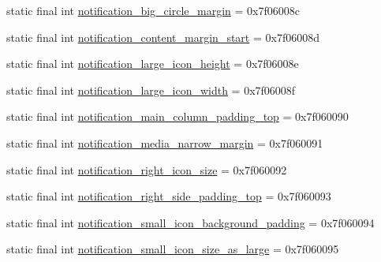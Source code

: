 \begin{DoxyCompactItemize}
\item 
static final int \mbox{\hyperlink{classandroid_1_1support_1_1graphics_1_1drawable_1_1animated_1_1R_1_1dimen_a29843189f8be69df69dab88fc2bd0316}{notification\+\_\+big\+\_\+circle\+\_\+margin}} = 0x7f06008c
\item 
static final int \mbox{\hyperlink{classandroid_1_1support_1_1graphics_1_1drawable_1_1animated_1_1R_1_1dimen_ab77e9e0b68ae1bdcca7c792a180808f6}{notification\+\_\+content\+\_\+margin\+\_\+start}} = 0x7f06008d
\item 
static final int \mbox{\hyperlink{classandroid_1_1support_1_1graphics_1_1drawable_1_1animated_1_1R_1_1dimen_a425b66d703859f43139060e3ee7e742f}{notification\+\_\+large\+\_\+icon\+\_\+height}} = 0x7f06008e
\item 
static final int \mbox{\hyperlink{classandroid_1_1support_1_1graphics_1_1drawable_1_1animated_1_1R_1_1dimen_ad1274a43256ec0e870cd00b2ef1b5523}{notification\+\_\+large\+\_\+icon\+\_\+width}} = 0x7f06008f
\item 
static final int \mbox{\hyperlink{classandroid_1_1support_1_1graphics_1_1drawable_1_1animated_1_1R_1_1dimen_adf23202b00bba2376f07a97f7e557b81}{notification\+\_\+main\+\_\+column\+\_\+padding\+\_\+top}} = 0x7f060090
\item 
static final int \mbox{\hyperlink{classandroid_1_1support_1_1graphics_1_1drawable_1_1animated_1_1R_1_1dimen_af5c89f4df946fb0716e0f517ace5ebd8}{notification\+\_\+media\+\_\+narrow\+\_\+margin}} = 0x7f060091
\item 
static final int \mbox{\hyperlink{classandroid_1_1support_1_1graphics_1_1drawable_1_1animated_1_1R_1_1dimen_a2d8fa1641c3f84e90f05a2d9b6a8a5ff}{notification\+\_\+right\+\_\+icon\+\_\+size}} = 0x7f060092
\item 
static final int \mbox{\hyperlink{classandroid_1_1support_1_1graphics_1_1drawable_1_1animated_1_1R_1_1dimen_acfbd23fa75e671c18e3967104d05e4b7}{notification\+\_\+right\+\_\+side\+\_\+padding\+\_\+top}} = 0x7f060093
\item 
static final int \mbox{\hyperlink{classandroid_1_1support_1_1graphics_1_1drawable_1_1animated_1_1R_1_1dimen_a13c0e7b83a691d504d0aec70da23bf52}{notification\+\_\+small\+\_\+icon\+\_\+background\+\_\+padding}} = 0x7f060094
\item 
static final int \mbox{\hyperlink{classandroid_1_1support_1_1graphics_1_1drawable_1_1animated_1_1R_1_1dimen_a4629cadbe259ff38fca602da79471f2f}{notification\+\_\+small\+\_\+icon\+\_\+size\+\_\+as\+\_\+large}} = 0x7f060095
\item 

\end{DoxyCompactItemize}
